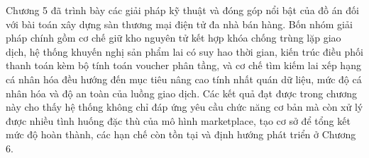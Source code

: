 \documentclass[../DoAn.tex]{subfiles}
\begin{document}
Chương 5 đã trình bày các giải pháp kỹ thuật và đóng góp nổi bật của đồ án đối với bài toán xây dựng sàn thương mại điện tử đa nhà bán hàng. Bốn nhóm giải pháp chính gồm cơ chế giữ kho nguyên tử kết hợp khóa chống trùng lặp giao dịch, hệ thống khuyến nghị sản phẩm lai có suy hao thời gian, kiến trúc điều phối thanh toán kèm bộ tính toán voucher phân tầng, và cơ chế tìm kiếm lai xếp hạng cá nhân hóa đều hướng đến mục tiêu nâng cao tính nhất quán dữ liệu, mức độ cá nhân hóa và độ an toàn của luồng giao dịch. Các kết quả đạt được trong chương này cho thấy hệ thống không chỉ đáp ứng yêu cầu chức năng cơ bản mà còn xử lý được nhiều tình huống đặc thù của mô hình marketplace, tạo cơ sở để tổng kết mức độ hoàn thành, các hạn chế còn tồn tại và định hướng phát triển ở Chương 6.
\end{document}
